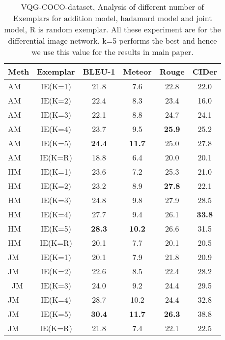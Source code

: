\documentclass[11pt,a4paper]{article}
\begin{document}
\begin{table}[ht]
\scriptsize
\centering
\begin{tabular}{|l|c|cccc|}
\hline \bf Meth & \bf Exemplar & \bf BLEU-1 & \bf Meteor & \bf Rouge  & \bf CIDer \\ \hline
AM &IE(K=1)& 21.8 &7.6 & 22.8 & 22.0\\ 
AM &IE(K=2)& 22.4 &8.3 & 23.4 & 16.0\\ 
AM &IE(K=3)& 22.1 &8.8 & 24.7 & 24.1\\ 
AM &IE(K=4)& 23.7 &9.5 &\textbf{ 25.9} & 25.2\\ 
AM &IE(K=5)&\textbf{24.4}  & \textbf{11.7} & 25.0 & {27.8}\\
AM &IE(K=R)& 18.8 & 6.4  & 20.0 & 20.1\\\hline 
HM &IE(K=1)& 23.6 &7.2 & 25.3 & 21.0\\ 
HM &IE(K=2)& 23.2 &8.9 & \textbf{27.8} & 22.1\\ 
HM &IE(K=3)& 24.8 &9.8 & 27.9 & 28.5\\ 
HM &IE(K=4) & 27.7 &9.4 & 26.1 & \textbf{33.8}\\ 
HM &IE(K=5)& \textbf{28.3} &\textbf{10.2}  & 26.6 & 31.5\\
HM &IE(K=R)& 20.1 & 7.7  & 20.1 & 20.5\\\hline 
JM &IE(K=1)& 20.1 &7.9 & 21.8 & 20.9\\ 
JM &IE(K=2)& 22.6 &8.5 & 22.4 & 28.2\\\
JM &IE(K=3)  & 24.0 &9.2 & 24.4 & 29.5\\
JM &IE(K=4)& 28.7 &10.2 & 24.4 & 32.8\\ 
JM &IE(K=5) &\textbf{30.4}  & \textbf{11.7} & \textbf{26.3} & {38.8}\\ 
JM &IE(K=R)& 21.8 & 7.4  & 22.1 & 22.5\\\hline 
\end{tabular}
\caption{\label{score_tab_11}VQG-COCO-dataset, Analysis of different number of Exemplars for addition model, hadamard model and joint model, R is random exemplar. All these experiment are for the differential image network. k=5 performs the best and hence we use this value for the results in main paper.}
\end{table}
\end{document}
